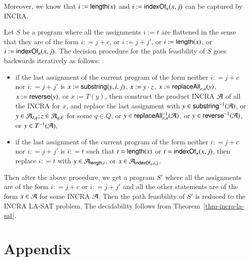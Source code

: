 \documentclass[sigplan,review,anonymous]{acmart}\settopmatter{printfolios=true,printccs=false,printacmref=false}
\begin{document}
Moreover, we know that $i := \mathsf{length}(x)$ and $i := \mathsf{indexOf}_u(x, j)$ can be captured by INCRA.

Let $S$ be a program where all the assignments $i:= t$ are flattened in the sense that they are of the form $i: = j+c$, or $i:=j+j'$, or $i:=\mathsf{length}(x)$, or $i: = \mathsf{indexOf}_u(x, j)$. The decision procedure for the path feasibility of $S$ goes backwards iteratively as follows:
\begin{itemize}
	\item if the last assignment of the current program of the form neither $i: = j+ c$ nor $i: = j+j'$ is   $x := \mathsf{substring}(y, i, j)$, $x:= y \cdot z$, $x:= \mathsf{replaceAll}_{e,u}(y)$, $x:=\mathsf{reverse}(y)$, or $x:=T(y)$,  then construct the product INCRA $\mathcal{A}$ of all the INCRA for $x$, and replace the last assignment with $y \in \mathsf{substring}^{-1}(\mathcal{A})$, or $y \in \mathcal{A}_{I, q}; z \in \mathcal{A}_{q, F} $ for some $q \in Q$, or $y \in \mathsf{replaceAll}_{e,u}^{-1}(\mathcal{A})$, or $y \in \mathsf{reverse}^{-1}(\mathcal{A})$, or $y \in T^{-1}(\mathcal{A})$,
	\item if the last assignment of the current program of the form neither $i: = j+ c$ nor $i: = j+j'$ is $i: = t$ such that $t = \mathsf{length}(x)$ or $t = \mathsf{indexOf}_u(x, j)$, then replace $i: = t $ with $y \in \mathcal{A}_{\mathsf{length}, i}$, or $x \in \mathcal{A}_{\mathsf{indexOf}_u, i, j}$.   
\end{itemize}
Then after the above procedure, we get a program $S'$ where all the assignments are of the form $i: = j+ c$ or $i: = j+j'$ and all the other statements are of the form $x \in \mathcal{A}$ for some INCRA $\mathcal{A}$. Then the path feasibility of $S'$ is reduced to the INCRA LA-SAT problem. The decidability follows from Theorem~\ref{thm-incra-la-sat}.








\appendix
\section{Appendix}

 
\end{document}
